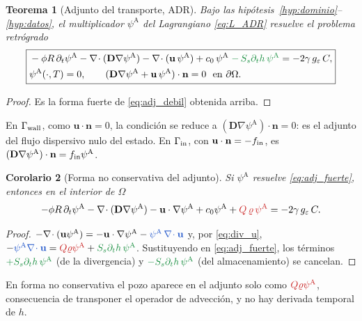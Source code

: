 \documentclass[11pt]{article}
\numberwithin{equation}{section}
\theoremstyle{plain}
\newtheorem{theorem}{Teorema}[section]
\newtheorem{corollary}[theorem]{Corolario}
\theoremstyle{definition}
\theoremstyle{remark}
\newcommand{\bu}{\mathbf{u}}
\newcommand{\bD}{\mathbf{D}}
\newcommand{\bn}{\mathbf{n}}
\newcommand{\Ceps}{g_\varepsilon}              %
\newcommand{\Nuc}{\varrho}                      %
\newcommand{\pA}{\psi^{\mathrm A}}          %
\newcommand{\sumi}[1]{{\color{cSum}#1}}
\newcommand{\divi}[1]{{\color{cDiv}#1}}
\newcommand{\alm}[1]{{\color{cAlm}#1}}
\begin{document}
\begin{theorem}[Adjunto del transporte, ADR]\label{thm:adj_ADR}
Bajo las hipótesis~\ref{hyp:dominio}--\ref{hyp:datos}, el multiplicador $\pA$ del Lagrangiano \eqref{eq:L_ADR}
resuelve el problema retrógrado
\begin{equation}
\boxed{\begin{aligned}
&-\phi R\,\partial_t\pA-\nabla\!\cdot(\bD\nabla\pA)-\nabla\!\cdot(\bu\,\pA)
+c_0\,\pA\;\alm{-\,S_s\partial_th\,\pA}=-2\gamma\,\Ceps\,C,\\
&\pA(\cdot,T)=0,\qquad(\bD\nabla\pA+\bu\,\pA)\cdot\bn=0\ \text{ en }\partial\Omega .
\end{aligned}}
\label{eq:adj_fuerte}
\end{equation}
\end{theorem}
\begin{proof}
Es la forma fuerte de \eqref{eq:adj_debil} obtenida arriba. \qedhere
\end{proof}
En $\Gamma_{\rm wall}$, como $\bu\cdot\bn=0$, la condición se reduce a $(\bD\nabla\pA)\cdot\bn=0$: es el adjunto
del flujo dispersivo nulo del estado. En $\Gamma_{\rm in}$, con $\bu\cdot\bn=-f_{\rm in}$, es $(\bD\nabla\pA)\cdot\bn=f_{\rm in}\pA$.

\begin{corollary}[Forma no conservativa del adjunto]\label{cor:adj_nc}
Si $\pA$ resuelve \eqref{eq:adj_fuerte}, entonces en el interior de $\Omega$
\begin{equation}
-\phi R\,\partial_t\pA-\nabla\!\cdot(\bD\nabla\pA)-\bu\cdot\nabla\pA
+c_0\pA+\sumi{Q\,\Nuc\,\pA}=-2\gamma\,\Ceps\,C .
\label{eq:adj_noconservativa}
\end{equation}
\end{corollary}
\begin{proof}
$-\nabla\!\cdot(\bu\pA)=-\bu\cdot\nabla\pA-\divi{\pA\,\nabla\!\cdot\bu}$ y, por \eqref{eq:div_u},
$-\divi{\pA\nabla\!\cdot\bu}=\sumi{Q\Nuc\pA}+\alm{S_s\partial_th\,\pA}$. Sustituyendo en \eqref{eq:adj_fuerte}, los términos
$\alm{+S_s\partial_th\,\pA}$ (de la divergencia) y $\alm{-S_s\partial_th\,\pA}$ (del almacenamiento) se cancelan.
\end{proof}
En forma no conservativa el pozo aparece en el adjunto solo como $\sumi{Q\Nuc\pA}$, consecuencia de transponer
el operador de advección, y no hay derivada temporal de $h$.
\end{document}
